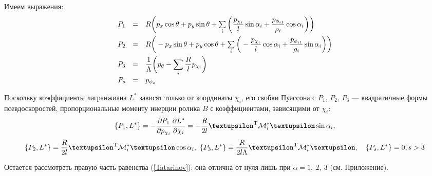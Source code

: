 Имеем выражения:
\begin{equation}\label{P}
    \begin{array}{rcl}
        P_1 & = & R\bigg(p_x\cos\theta + p_y\sin\theta + \sum\limits_{i}\bigg(\ddfrac{p_{\chi_i}}{l}\sin\alpha_i +  \ddfrac{p_{\phi_{i1}}}{\rho_i}\cos\alpha_i\bigg)\bigg)\vsp
        P_2 & = & R\bigg(-p_x\sin\theta + p_y\cos\theta + \sum\limits_{i}\bigg(-\ddfrac{p_{\chi_i}}{l}\cos\alpha_i +  \ddfrac{p_{\phi_{i1}}}{\rho_i}\sin\alpha_i\bigg)\bigg)\vsp
        P_3 & = & \ddfrac{1}{\Lambda}\bigg(p_\theta - \sum\limits_{i}\ddfrac{R}{l}p_{\chi_i}\bigg)\vsp
        P_s & = & p_{\phi_s}
    \end{array}
\end{equation}

Поскольку коэффициенты  лагранжиана $L^{*}$ зависят только от координаты $\chi_i$, его скобки Пуассона с $P_1$, $P_2$, $P_3$  --- квадратичные формы псевдоскоростей, пропорциональные моменту инерции ролика $B$ с коэффициентами, зависящими от $\chi_i$:
$$
\{P_1, L^*\} = -\frac{\partial P_1}{\partial p_{\chi_i}}\frac{\partial L^*}{\partial \chi_i} = -\frac{R}{2l}\vnu^\mathrm{T}\M^*_i\vnu\sin\alpha_i,
$$
$$
\{P_2, L^*\} = \frac{R}{2l}\vnu^\mathrm{T}\M^*_i\vnu\cos\alpha_i,\  
\{P_3, L^*\} = \frac{R}{2l\Lambda}\vnu^\mathrm{T}\M^*_i\vnu,\quad \{P_s,L^*\} = 0, s>3
$$

Остается рассмотреть правую часть равенства (\ref{Tatarinov}): она отлична от нуля лишь при $\alpha = 1,\ 2,\ 3$ (см. Приложение).



